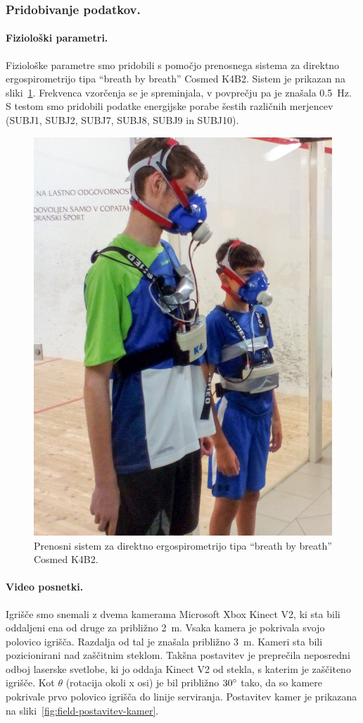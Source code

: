 \subsubsection{Pridobivanje podatkov.}
\paragraph{Fiziolo\v{ski} parametri.}
Fiziološke parametre smo pridobili s pomočjo prenosnega sistema za direktno ergospirometrijo tipa ``breath  by breath'' Cosmed K4B2. Sistem je prikazan na sliki~\ref{fig:maske}. Frekvenca vzorčenja se je spreminjala, v povprečju pa je znašala \SI{0.5}{\hertz}. S testom smo pridobili podatke energijske porabe šestih različnih merjencev (SUBJ1, SUBJ2, SUBJ7, SUBJ8, SUBJ9 in SUBJ10).


\begin{figure}[!htb]
	\centering
	\includegraphics[width=0.4\columnwidth]{./Slike/squash-maske-corrected.jpg}	
	\caption[Prenosni sistem za direktno ergospirometrijo]{Prenosni sistem za direktno ergospirometrijo tipa ``breath  by breath'' Cosmed K4B2.}
	\label{fig:maske}
\end{figure}

\paragraph{Video posnetki.}
Igrišče smo snemali z dvema kamerama Microsoft Xbox Kinect V2, ki sta bili oddaljeni ena od druge za približno \SI{2}{m}. Vsaka kamera je pokrivala svojo polovico igrišča. Razdalja od tal je znašala približno \SI{3}{m}. Kameri sta bili pozicionirani nad zaščitnim steklom. Takšna postavitev je preprečila neposredni odboj laserske svetlobe, ki jo oddaja Kinect V2 od stekla, s katerim je zaščiteno igrišče. Kot $\theta$ (rotacija okoli x osi) je bil približno $30^\circ$ tako, da so kamere pokrivale prvo polovico igrišča do linije serviranja. Postavitev kamer je prikazana na sliki~\ref{fig:field-postavitev-kamer}.

